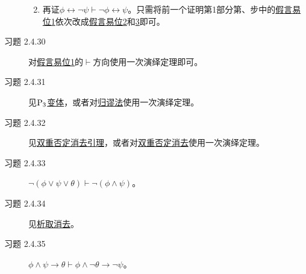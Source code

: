 \documentclass[punct=custom/kaiming,fontset=none]{ctexart}
\makeatletter
\renewenvironment{proof}[1][\proofname]{\par
  \pushQED{\qed}%
  \normalfont \topsep6\p@\@plus6\p@\relax
  \trivlist
  \item[\hskip\labelsep
    \bfseries
    #1%
    ]\ignorespaces
}{%
  \popQED\endtrivlist\@endpefalse
}
\theoremstyle{remark}
\let\proves\vdash
\makeatother
\begin{document}
\begin{description}
\begin{enumerate}
\begin{proof}
      再证\(\phi \leftrightarrow \neg\psi \proves \neg\phi \leftrightarrow \psi\)。只需将前一个证明第1部分第、步中的\hyperlink{ded:contrapose1}{假言易位1}依次改成\hyperlink{ded:contrapose2}{假言易位2}和\hyperlink{ded:contrapose3}{3}即可。
    \end{proof}
  \end{enumerate}
\item[习题 2.4.30] 对\hyperlink{ded:contrapose1}{假言易位1}的\(\vdash\)方向使用一次演绎定理即可。
\item[习题 2.4.31] 见\hyperref[lem:p3var]{\(\rm P_3\)变体}，或者对\hyperlink{ded:raa}{归谬法}使用一次演绎定理。
\item[习题 2.4.32] 见\hyperref[lem:dnElim]{双重否定消去引理}，或者对\hyperlink{ded:dnElim}{双重否定消去}使用一次演绎定理。
\item[习题 2.4.33] \(\neg(\phi \lor \psi \lor \theta) \proves \neg(\phi \land \psi)\)。
  \begin{proof}
    \leavevmode
    \begin{ND}
      \label{1}
      \label{2}
      \label{3}
      \label{4}
      \label{5}
      \label{6}
    \end{ND}
  \end{proof}
\item[习题 2.4.34] 见\hyperlink{ded:disjElim}{析取消去}。
\item[习题 2.4.35] \(\phi \land \psi \to \theta \proves \phi \land \neg\theta \to \neg\psi\)。
  \begin{proof}
    \leavevmode
    \begin{ND}
      \label{1}
      \label{2}
      \label{3}
      \label{4}

\end{ND}
\end{proof}
\end{description}
\end{document}
